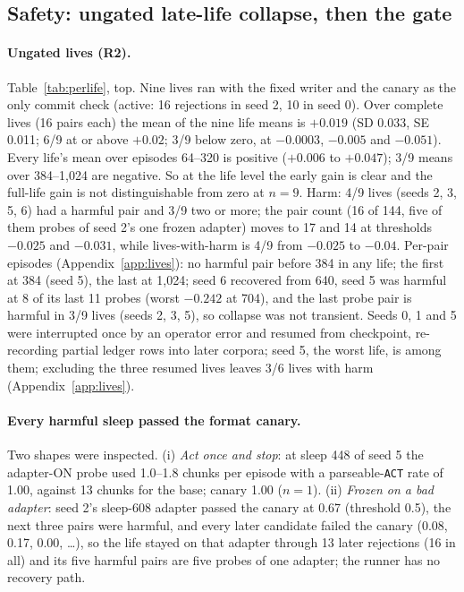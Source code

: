 \documentclass{article}
\begin{document}
\subsection{Safety: ungated late-life collapse, then the gate}
\label{sec:safety}

\paragraph{Ungated lives (R2).} Table~\ref{tab:perlife}, top. Nine lives ran with the fixed writer and the canary as the only commit check (active: 16 rejections in seed 2, 10 in seed 0). Over complete lives (16 pairs each) the mean of the nine life means is $+0.019$ (SD 0.033, SE 0.011; 6/9 at or above $+0.02$; 3/9 below zero, at $-0.0003$, $-0.005$ and $-0.051$). Every life's mean over episodes 64--320 is positive ($+0.006$ to $+0.047$); 3/9 means over 384--1{,}024 are negative. So at the life level the early gain is clear and the full-life gain is not distinguishable from zero at $n = 9$. Harm: 4/9 lives (seeds 2, 3, 5, 6) had a harmful pair and 3/9 two or more; the pair count (16 of 144, five of them probes of seed 2's one frozen adapter) moves to 17 and 14 at thresholds $-0.025$ and $-0.031$, while lives-with-harm is 4/9 from $-0.025$ to $-0.04$. Per-pair episodes (Appendix~\ref{app:lives}): no harmful pair before 384 in any life; the first at 384 (seed 5), the last at 1{,}024; seed 6 recovered from 640, seed 5 was harmful at 8 of its last 11 probes (worst $-0.242$ at 704), and the last probe pair is harmful in 3/9 lives (seeds 2, 3, 5), so collapse was not transient. Seeds 0, 1 and 5 were interrupted once by an operator error and resumed from checkpoint, re-recording partial ledger rows into later corpora; seed 5, the worst life, is among them; excluding the three resumed lives leaves 3/6 lives with harm (Appendix~\ref{app:lives}).

\paragraph{Every harmful sleep passed the format canary.} Two shapes were inspected. (i) \emph{Act once and stop}: at sleep 448 of seed 5 the adapter-ON probe used 1.0--1.8 chunks per episode with a parseable-\texttt{ACT} rate of 1.00, against 13 chunks for the base; canary 1.00 ($n = 1$). (ii) \emph{Frozen on a bad adapter}: seed 2's sleep-608 adapter passed the canary at 0.67 (threshold 0.5), the next three pairs were harmful, and every later candidate failed the canary (0.08, 0.17, 0.00, \ldots), so the life stayed on that adapter through 13 later rejections (16 in all) and its five harmful pairs are five probes of one adapter; the runner has no recovery path.
\end{document}
